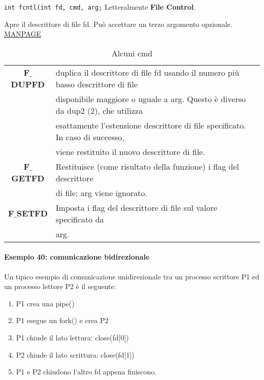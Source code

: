     
    \texttt{int fcntl(int fd, cmd, arg;}
    Letteralmente \textbf{File Control}.
    
    Apre il descrittore di file fd. Può accettare un terzo argomento opzionale. \href{https://man7.org/linux/man-pages/man2/fcntl.2.html}{MANPAGE}
    \newline

\begin{table}[ht]
    \centering
    \begin{tabular}{c l}
    \textbf{F$\_$DUPFD} 
            &    duplica il descrittore di file fd usando il numero più basso descrittore di file \\
            &    disponibile maggiore o uguale a arg. Questo è diverso da dup2 (2), che utilizza \\
            &    esattamente l'estensione descrittore di file specificato. In caso di successo, \\
            &    viene restituito il nuovo descrittore di file. \\
    
    \textbf{F$\_$GETFD} & Restituisce (come risultato della funzione) i flag del descrittore \\
            &    di file; arg viene ignorato. \\
    
    \textbf{F$\_$SETFD} & Imposta i flag del descrittore di file sul valore specificato da\\
            &   arg. \\
    
\end{tabular}
    \caption{Alcuni cmd}
    \label{tab:tab4}
\end{table}
    
    \paragraph{Esempio 40: comunicazione bidirezionale} \hfill \break
    Un tipico esempio di comunicazione unidirezionale tra un processo scrittore P1 ed un processo lettore P2 è il seguente:
    \begin{enumerate}
        \item P1 crea una pipe()
        \item P1 esegue un fork() e crea P2
        \item P1 chiude il lato lettura: close(fd[0])
        \item P2 chiude il lato scrittura: close(fd[1])
        \item P1 e P2 chiudono l'altro fd appena finiscono.
    \end{enumerate}
    
    

